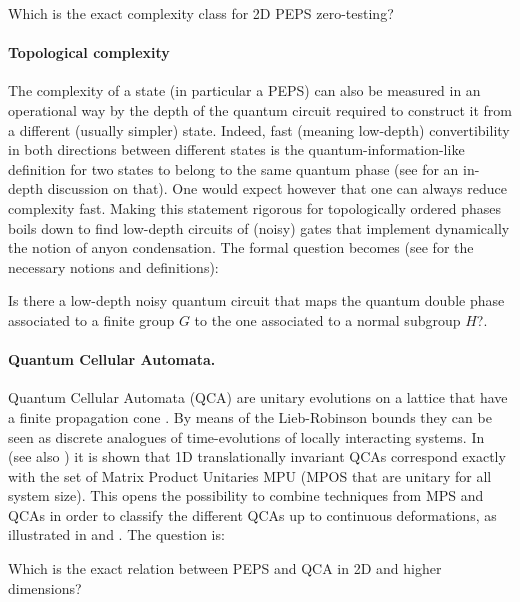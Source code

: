 \documentclass[smallextended]{svjour3}
\renewcommand{\1}{\mathbbm{1}}
\begin{document}
\begin{question}
    Which is the exact complexity class for 2D PEPS zero-testing?
\end{question}

\paragraph{Topological complexity} The complexity of a state (in particular a PEPS) can also be measured in an operational way by the depth of the quantum circuit required to construct it from a different (usually simpler) state. Indeed, fast (meaning low-depth) convertibility in both directions between different states is the quantum-information-like definition for two states to belong to the same quantum phase (see \cite{Coser} for an in-depth discussion on that). One would expect however that one can always reduce complexity fast. Making this statement rigorous for topologically ordered phases boils down to find low-depth circuits of (noisy) gates that implement dynamically the notion of anyon condensation.  The formal question becomes (see \cite{Coser} for the necessary notions and definitions):

\begin{question}
    Is there a low-depth noisy quantum circuit that maps the quantum double phase associated to a finite group $G$ to the one associated to a normal subgroup $H$?.
\end{question}

\paragraph{Quantum Cellular Automata.} Quantum Cellular Automata (QCA) are unitary evolutions on a lattice that have a finite propagation cone \cite{QCA-Werner}. By means of the Lieb-Robinson bounds they can be seen as discrete analogues of time-evolutions of locally interacting systems. In \cite{QCA} (see also \cite{QCA-chen}) it is shown that 1D translationally invariant QCAs correspond exactly with the set of Matrix Product Unitaries MPU (MPOS that are unitary for all system size). This opens the possibility to combine techniques from MPS and QCAs in order to classify the different QCAs up to continuous deformations, as illustrated in \cite{QCA} and \cite{QCA-onsite}.  The question is:


\begin{question}
    Which is the exact relation between PEPS and QCA in 2D and higher dimensions?
\end{question}
\end{document}
